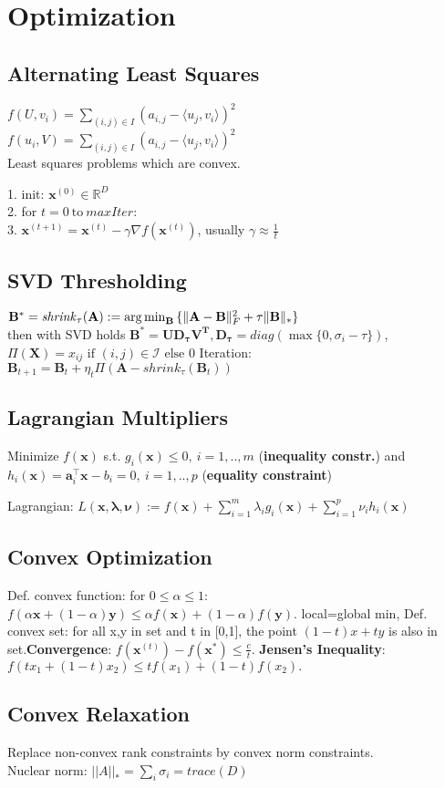 \section{Optimization}

\subsection*{Alternating Least Squares}
$f(U,v_i)=\sum_{(i,j)\in I} (a_{i,j} - \langle u_j, v_i \rangle)^2$\\
$f(u_i,V)=\sum_{(i,j)\in I} (a_{i,j} - \langle u_j, v_i \rangle)^2$\\
Least squares problems which are convex.


1. init: $\mathbf{x}^{(0)} \in \mathbb{R}^D$\\
2. for $t = 0 \ \text{to} \ \mathit{maxIter}$:\\
3. $\mathbf{x}^{(t+1)} = \mathbf{x}^{(t)} - \gamma \nabla f(\mathbf{x}^{(t)})$, usually $\gamma \approx \frac{1}{t}$

\subsection*{SVD Thresholding}
$\mathbf{B}^{*}=\mathit{shrink}_\tau(\mathbf{A}):=\operatorname*{arg\,min}_{\mathbf{B}}{\{\|\mathbf{A-B}\|^2_F + \tau\|\mathbf{B}\|_{*}\}}$\\
then with SVD holds $\mathbf{B^*=UD_\tau V^T, D_\tau} = \mathit{diag}(\max\{0,\sigma_i - \tau\})$,
$\Pi(\mathbf{X}) = x_{ij} \text{ if } (i,j) \in \mathcal{I} \text{ else } 0$ Iteration: $\mathbf{B}_{t+1}=\mathbf{B}_t + \eta_t \Pi(\mathbf{A} - \mathit{shrink}_\tau(\mathbf{B}_t))$
\subsection*{Lagrangian Multipliers}
Minimize  $f(\mathbf{x})$ s.t. $g_i(\mathbf{x}) \leq 0,\ i = 1, .., m$ (\textbf{inequality constr.}) and $h_i(\mathbf{x}) = \mathbf{a}_i^\top \mathbf{x} - b_i = 0,\ i = 1, .., p$ (\textbf{equality constraint})
\begin{compactdesc}
	\item[Lagrangian:] $L(\mathbf{x}, \boldsymbol{\lambda}, \boldsymbol{\nu}) := f(\mathbf{x}) + \sum_{i=1}^m \lambda_i g_i(\mathbf{x}) + \sum_{i=1}^p \nu_i h_i(\mathbf{x})$
\end{compactdesc}

\subsection*{Convex Optimization}
Def. convex function: for $0 \leq \alpha \leq 1$: $f(\alpha \mathbf{x} + (1 - \alpha)\mathbf{y}) \leq \alpha f(\mathbf{x}) + (1-\alpha)f(\mathbf{y})$. local=global min, Def. convex set: for all x,y in set and t in [0,1], the point $(1-t)x + ty$ is also in set.\textbf{Convergence}: $f(\mathbf{x}^{(t)}) - f(\mathbf{x}^*) \le \frac{c}{t}$.
\textbf{Jensen's Inequality}: $f(tx_{1}+(1-t)x_{2})\leq tf(x_{1})+(1-t)f(x_{2}).$


\subsection*{Convex Relaxation}
Replace non-convex rank constraints by convex norm constraints.\\
Nuclear norm: $||A||_* = \sum_i \sigma_i = trace(D)$
